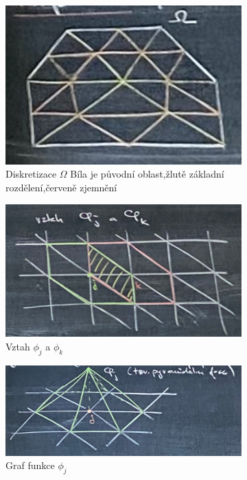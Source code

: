 \documentclass[../main.tex]{subfiles}
\begin{document}
\begin{figure}[h]
    \centering
    \begin{subfigure}[t]{0.3\textwidth}
        \centering
        \includegraphics[width=1\textwidth]{images/diskretizace.png}
        \caption{Diskretizace $\Omega$ \hfill\break Bíla je původní oblast,\hfill\break žlutě základní rozdělení,\hfill\break červeně zjemnění \hfill}
    \end{subfigure}
    \hfill
    \begin{subfigure}[t]{0.3\textwidth}
        \centering
        \includegraphics[width=1\textwidth]{images/vztahphi.png}
        \caption{Vztah $\phi_j$ a $\phi_k$}
    \end{subfigure}
    \hfill
    \begin{subfigure}[t]{0.3\textwidth}
        \centering
        \includegraphics[width=1\textwidth]{images/grafphi.png}
        \caption{Graf funkce $\phi_j$}
    \end{subfigure}
    \caption{}
\end{figure}
\end{document}
